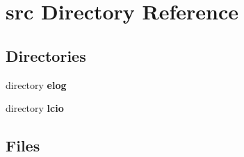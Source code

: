 \section{src Directory Reference}
\label{dir_96d553498d9584ffd97541c009cfd4b6}
\subsection*{Directories}
\begin{DoxyCompactItemize}
\item 
directory {\bf elog}
\item 
directory {\bf lcio}
\end{DoxyCompactItemize}
\subsection*{Files}
